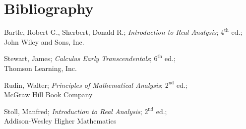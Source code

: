 \section{Bibliography}

\begin{thebibliography}{9}
Bartle, Robert G., Sherbert, Donald R.; \textit{Introduction to Real Analysis}; $4^{\text{th}}$ ed.;\\ John Wiley and Sons, Inc.

Stewart, James; \textit{Calculus Early Transcendentals}; $6^{\text{th}}$ ed.;\\ Thomson Learning, Inc.

Rudin, Walter; \textit{Principles of Mathematical Analysis}; $2^{\text{nd}}$ ed.;\\ McGraw Hill Book Company

Stoll, Manfred; \textit{Introduction to Real Analysis}; $2^{\text{nd}}$ ed.;\\ Addison-Wesley Higher Mathematics

\end{thebibliography}